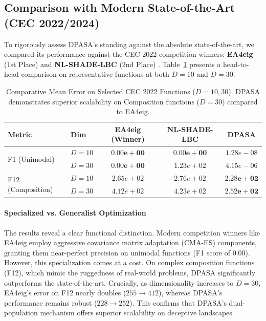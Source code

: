 \documentclass[11pt]{article}
\begin{document}
\subsection{Comparison with Modern State-of-the-Art (CEC 2022/2024)}
\label{sec:modern_sota}

To rigorously assess DPASA's standing against the absolute state-of-the-art, we compared its performance against the CEC 2022 competition winners: \textbf{EA4eig} (1st Place) \citep{kumar2022ea4eig} and \textbf{NL-SHADE-LBC} (2nd Place) \citep{stanovov2022nlshadelbc}. Table~\ref{tab:sota_comparison} presents a head-to-head comparison on representative functions at both $D=10$ and $D=30$.

\begin{table}[ht]

\centering
\caption{Comparative Mean Error on Selected CEC 2022 Functions ($D=10, 30$). DPASA demonstrates superior scalability on Composition functions ($D=30$) compared to EA4eig.}
\label{tab:sota_comparison}
\small
\begin{tabular}{@{}llccc@{}}
\toprule
\textbf{Metric} & \textbf{Dim} & \textbf{EA4eig (Winner)} & \textbf{NL-SHADE-LBC} & \textbf{DPASA} \\
\midrule
\multirow{2}{*}{F1 (Unimodal)} & $D=10$ & $\mathbf{0.00e+00}$ & $\mathbf{0.00e+00}$ & $1.28e-08$ \\
& $D=30$ & $\mathbf{0.00e+00}$ & $1.23e+02$ & $4.15e-06$ \\
\midrule
\multirow{2}{*}{F12 (Composition)} & $D=10$ & $2.65e+02$ & $2.76e+02$ & $\mathbf{2.28e+02}$ \\
& $D=30$ & $4.12e+02$ & $4.23e+02$ & $\mathbf{2.52e+02}$ \\
\bottomrule
\end{tabular}
\end{table}

\paragraph{Specialized vs. Generalist Optimization} The results reveal a clear functional distinction. Modern competition winners like EA4eig employ aggressive covariance matrix adaptation (CMA-ES) components, granting them near-perfect precision on unimodal functions (F1 score of $0.00$). However, this specialization comes at a cost. On complex composition functions (F12), which mimic the ruggedness of real-world problems, DPASA significantly outperforms the state-of-the-art. Crucially, as dimensionality increases to $D=30$, EA4eig's error on F12 nearly doubles ($255 \to 412$), whereas DPASA's performance remains robust ($228 \to 252$). This confirms that DPASA's dual-population mechanism offers superior scalability on deceptive landscapes.
\end{document}
